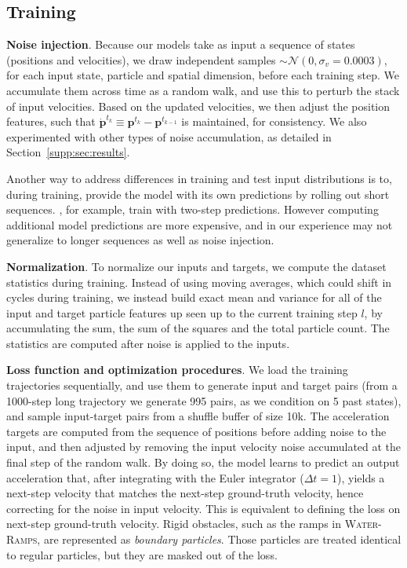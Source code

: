 \documentclass{article}
\newcommand{\xhdr}[1]{{\noindent\bfseries #1}.}
\newcommand\domain[1]{\textsc{#1}}
\begin{document}
\subsection{Training}

\xhdr{Noise injection} Because our models take as input a sequence of states (positions and velocities), we draw independent samples $\sim \mathcal{N}(0, \sigma_v=0.0003)$, for each input state, particle and spatial dimension, before each training step. We accumulate them across time as a random walk, and use this to perturb the stack of input velocities. Based on the updated velocities, we then adjust the position features, such that $\dot{\mathbf{p}}^{t_k} \equiv \mathbf{p}^{t_{k}} - \mathbf{p}^{t_{k-1}}$ is maintained, for consistency. We also experimented with other types of noise accumulation, as detailed in Section~\ref{supp:sec:results}.

Another way to address differences in training and test input distributions is to, during training, provide the model with its own predictions by rolling out short sequences. \citet{ummenhofer2020lagrangian}, for example, train with two-step predictions. However computing additional model predictions are more expensive, and in our experience may not generalize to longer sequences as well as noise injection.

\xhdr{Normalization} To normalize our inputs and targets, we compute the dataset statistics during training. Instead of using moving averages, which could shift in cycles during training, we instead build exact mean and variance for all of the input and target particle features up seen up to the current training step $l$, by accumulating the sum, the sum of the squares and the total particle count. The statistics are computed after noise is applied to the inputs. 
%
%

\xhdr{Loss function and optimization procedures} 
We load the training trajectories sequentially, and use them to generate input and target pairs (from a 1000-step long trajectory we generate 995 pairs, as we condition on 5 past states), and sample input-target pairs from a shuffle buffer of size 10k. 
%
The acceleration targets are computed from the sequence of positions before adding noise to the input, and then adjusted by removing the input velocity noise accumulated at the final step of the random walk. By doing so, the model learns to predict an output acceleration that, after integrating with the Euler integrator ($\Delta t=1$), yields a next-step velocity that matches the next-step ground-truth velocity, hence correcting for the noise in input velocity. This is equivalent to defining the loss on next-step ground-truth velocity.
%
Rigid obstacles, such as the ramps in \domain{Water-Ramps}, are represented as \emph{boundary particles}. Those particles are treated identical to regular particles, but they are masked out of the loss.
%
\end{document}
